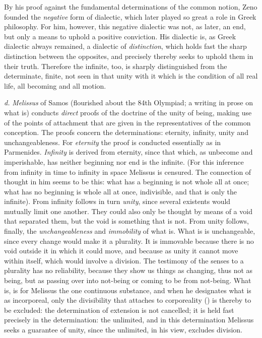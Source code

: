 By his proof against the fundamental determinations of the common notion, Zeno founded the \emph{negative} form
of dialectic, which later played so great a role in
Greek philosophy. For him, however, this negative dialectic was not, as later, an end, but only a means to uphold
a positive conviction. His dialectic is, as Greek
dialectic always remained, a dialectic of \emph{distinction}, which holds fast the sharp distinction between the opposites, and precisely
thereby seeks to uphold them in their truth. Therefore the infinite, too, is
sharply distinguished from the determinate, finite, not
seen in that unity with it which is the condition of all real life, all becoming and all motion.

\textit{d.} \emph{Melissus} of Samos (flourished about the 84th Olympiad;
a writing in prose on what is) conducts \emph{direct} proofs of
the doctrine of the unity of being, making use of the points of attachment that
are given in the representatives of the common conception.
The proofs concern the determinations: eternity, infinity, unity and unchangeableness. For \emph{eternity} the proof is conducted essentially as in Parmenides. \emph{Infinity} is derived from eternity, since that which, as unbecome and imperishable, has neither
beginning nor end is the infinite. (For this
inference from infinity in time to infinity in space Melissus
is censured. The connection of thought in him seems to be this:
what has a beginning is not whole all at once;
what has no beginning is whole all at once, indivisible,
and that is only the infinite). From infinity follows
in turn \emph{unity}, since several existents would mutually limit
one another. They could also only be thought by means of a void
that separated them, but the void is something that is not. From
unity follows, finally, the \emph{unchangeableness}
and \emph{immobility} of what is. What is is unchangeable, since every change would make it a plurality. It is
immovable because there is no void outside it in which it
could move, and because as unity it cannot move
within itself, which would involve a division. The testimony
of the senses to a plurality has no reliability, because they
show us things as changing, thus not as being, but as passing over into not-being or coming to be
from not-being. What is, is for Melissus the one continuous substance, and when he designates what is as
incorporeal, only the divisibility that attaches to
corporeality () is thereby to be excluded: the determination of extension is not cancelled; it is held fast precisely in the determination:
the unlimited, and in this determination Melissus seeks
a guarantee of unity, since the unlimited, in his
view, excludes division.

